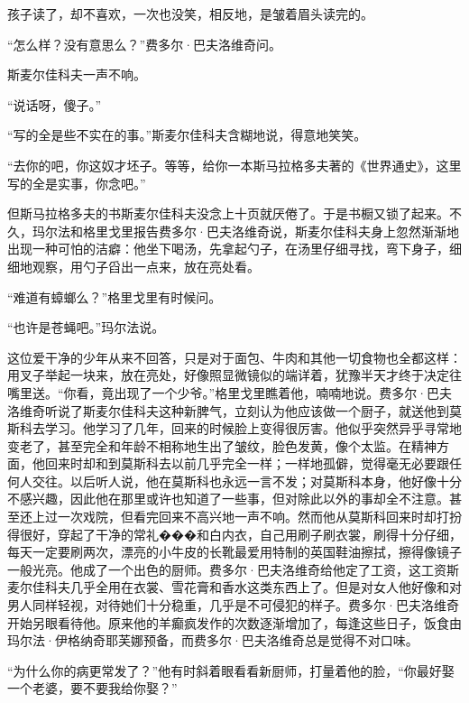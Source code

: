 \par 孩子读了，却不喜欢，一次也没笑，相反地，是皱着眉头读完的。
\par “怎么样？没有意思么？”费多尔·巴夫洛维奇问。
\par 斯麦尔佳科夫一声不响。
\par “说话呀，傻子。”
\par “写的全是些不实在的事。”斯麦尔佳科夫含糊地说，得意地笑笑。
\par “去你的吧，你这奴才坯子。等等，给你一本斯马拉格多夫著的《世界通史》，这里写的全是实事，你念吧。”
\par 但斯马拉格多夫的书斯麦尔佳科夫没念上十页就厌倦了。于是书橱又锁了起来。不久，玛尔法和格里戈里报告费多尔·巴夫洛维奇说，斯麦尔佳科夫身上忽然渐渐地出现一种可怕的洁癖：他坐下喝汤，先拿起勺子，在汤里仔细寻找，弯下身子，细细地观察，用勺子舀出一点来，放在亮处看。
\par “难道有蟑螂么？”格里戈里有时候问。
\par “也许是苍蝇吧。”玛尔法说。
\par 这位爱干净的少年从来不回答，只是对于面包、牛肉和其他一切食物也全都这样：用叉子举起一块来，放在亮处，好像照显微镜似的端详着，犹豫半天才终于决定往嘴里送。“你看，竟出现了一个少爷。”格里戈里瞧着他，喃喃地说。费多尔·巴夫洛维奇听说了斯麦尔佳科夫这种新脾气，立刻认为他应该做一个厨子，就送他到莫斯科去学习。他学习了几年，回来的时候脸上变得很厉害。他似乎突然异乎寻常地变老了，甚至完全和年龄不相称地生出了皱纹，脸色发黄，像个太监。在精神方面，他回来时却和到莫斯科去以前几乎完全一样；一样地孤僻，觉得毫无必要跟任何人交往。以后听人说，他在莫斯科也永远一言不发；对莫斯科本身，他好像十分不感兴趣，因此他在那里或许也知道了一些事，但对除此以外的事却全不注意。甚至还上过一次戏院，但看完回来不高兴地一声不响。然而他从莫斯科回来时却打扮得很好，穿起了干净的常礼���和白内衣，自己用刷子刷衣裳，刷得十分仔细，每天一定要刷两次，漂亮的小牛皮的长靴最爱用特制的英国鞋油擦拭，擦得像镜子一般光亮。他成了一个出色的厨师。费多尔·巴夫洛维奇给他定了工资，这工资斯麦尔佳科夫几乎全用在衣裳、雪花膏和香水这类东西上了。但是对女人他好像和对男人同样轻视，对待她们十分稳重，几乎是不可侵犯的样子。费多尔·巴夫洛维奇开始另眼看待他。原来他的羊癫疯发作的次数逐渐增加了，每逢这些日子，饭食由玛尔法·伊格纳奇耶芙娜预备，而费多尔·巴夫洛维奇总是觉得不对口味。
\par “为什么你的病更常发了？”他有时斜着眼看看新厨师，打量着他的脸，“你最好娶一个老婆，要不要我给你娶？”
